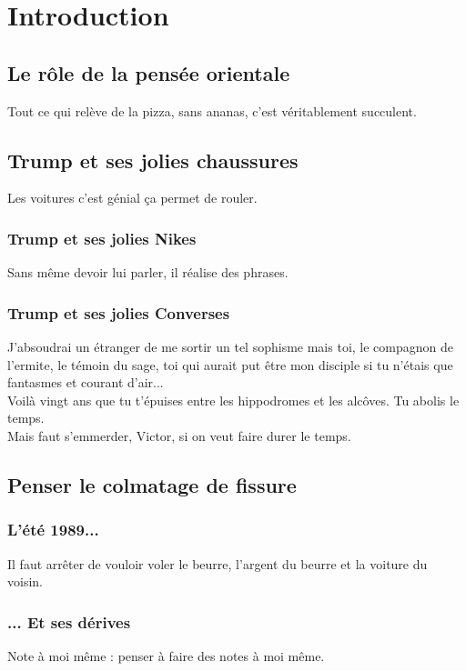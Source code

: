\documentclass{article}
\begin{document}
\maketitle

\section{Introduction}
\subsection{Le rôle de la pensée orientale}
Tout ce qui relève de la pizza, sans ananas, c'est véritablement succulent.

\subsection{Trump et ses jolies chaussures}
Les voitures c'est génial ça permet de rouler.

\subsubsection{Trump et ses jolies Nikes}
Sans même devoir lui parler, il réalise des phrases.

\subsubsection{Trump et ses jolies Converses}
J'absoudrai un étranger de me sortir un tel sophisme mais toi, le compagnon de l'ermite, le témoin du sage, toi qui aurait put être mon disciple si tu n'étais que fantasmes et courant d'air...\\
Voilà vingt ans que tu t'épuises entre les hippodromes et les alcôves. Tu abolis le temps.\\
Mais faut s'emmerder, Victor, si on veut faire durer le temps.

\subsection{Penser le colmatage de fissure}

\subsubsection{L'été 1989...}

Il faut arrêter de vouloir voler le beurre, l'argent du beurre et la voiture du voisin.

\subsubsection{... Et ses dérives}
Note à moi même : penser à faire des notes à moi même.
\end{document}
